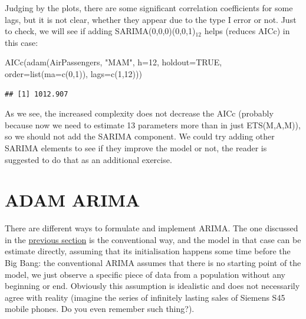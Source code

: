 \documentclass[
]{book}
\newenvironment{Shaded}{\begin{snugshade}}{\end{snugshade}}
\newcommand{\AttributeTok}[1]{\textcolor[rgb]{0.77,0.63,0.00}{#1}}
\newcommand{\ConstantTok}[1]{\textcolor[rgb]{0.00,0.00,0.00}{#1}}
\newcommand{\DecValTok}[1]{\textcolor[rgb]{0.00,0.00,0.81}{#1}}
\newcommand{\FunctionTok}[1]{\textcolor[rgb]{0.00,0.00,0.00}{#1}}
\newcommand{\NormalTok}[1]{#1}
\newcommand{\StringTok}[1]{\textcolor[rgb]{0.31,0.60,0.02}{#1}}
\theoremstyle{definition}
\theoremstyle{definition}
\theoremstyle{definition}
\theoremstyle{definition}
\theoremstyle{remark}
\begin{document}
Judging by the plots, there are some significant correlation coefficients for some lags, but it is not clear, whether they appear due to the type I error or not. Just to check, we will see if adding SARIMA(0,0,0)(0,0,1)\(_{12}\) helps (reduces AICc) in this case:

\begin{Shaded}
\begin{Highlighting}[]
\FunctionTok{AICc}\NormalTok{(}\FunctionTok{adam}\NormalTok{(AirPassengers, }\StringTok{"MAM"}\NormalTok{, }\AttributeTok{h=}\DecValTok{12}\NormalTok{, }\AttributeTok{holdout=}\ConstantTok{TRUE}\NormalTok{,}
          \AttributeTok{order=}\FunctionTok{list}\NormalTok{(}\AttributeTok{ma=}\FunctionTok{c}\NormalTok{(}\DecValTok{0}\NormalTok{,}\DecValTok{1}\NormalTok{)), }\AttributeTok{lags=}\FunctionTok{c}\NormalTok{(}\DecValTok{1}\NormalTok{,}\DecValTok{12}\NormalTok{)))}
\end{Highlighting}
\end{Shaded}

\begin{verbatim}
## [1] 1012.907
\end{verbatim}

As we see, the increased complexity does not decrease the AICc (probably because now we need to estimate 13 parameters more than in just ETS(M,A,M)), so we should not add the SARIMA component. We could try adding other SARIMA elements to see if they improve the model or not, the reader is suggested to do that as an additional exercise.

\hypertarget{ADAMARIMA}{%
\chapter{ADAM ARIMA}\label{ADAMARIMA}}

There are different ways to formulate and implement ARIMA. The one discussed in the \protect\hyperlink{ARIMA}{previous section} is the conventional way, and the model in that case can be estimate directly, assuming that its initialisation happens some time before the Big Bang: the conventional ARIMA assumes that there is no starting point of the model, we just observe a specific piece of data from a population without any beginning or end. Obviously this assumption is idealistic and does not necessarily agree with reality (imagine the series of infinitely lasting sales of Siemens S45 mobile phones. Do you even remember such thing?).
\end{document}
